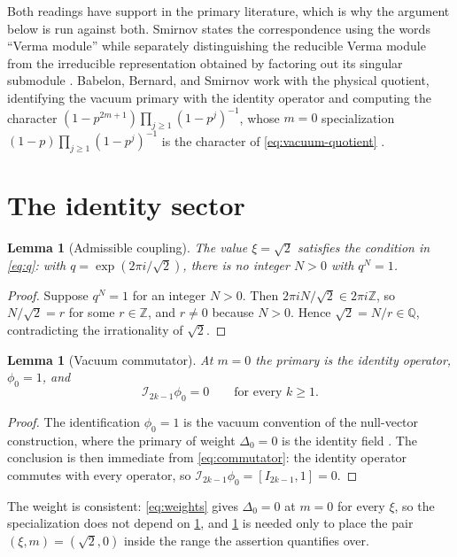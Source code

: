 \documentclass[11pt,reqno]{amsart}
\theoremstyle{plain}
\newtheorem{lemma}[theorem]{Lemma}
\theoremstyle{definition}
\theoremstyle{remark}
\numberwithin{equation}{section}
\newcommand{\Iop}{\mathcal I}
\begin{document}
Both readings have support in the primary literature, which is why the
argument below is run against both. Smirnov states the correspondence using
the words ``Verma module'' while separately distinguishing the reducible
Verma module from the irreducible representation obtained by factoring out its
singular submodule \cite{Smirnov_1998so}. Babelon, Bernard, and Smirnov work
with the physical quotient, identifying the vacuum primary with the identity
operator and computing the character
$(1-p^{2m+1})\prod_{j\ge1}(1-p^{j})^{-1}$, whose $m=0$ specialization
$(1-p)\prod_{j\ge1}(1-p^{j})^{-1}$ is the character of
\eqref{eq:vacuum-quotient} \cite{Babelon_1997nv}.

\section{The identity sector}
\label{sec:vacuum}

\begin{lemma}[Admissible coupling]
\label{lem:allowed}
The value $\xi=\sqrt2$ satisfies the condition in \eqref{eq:q}: with
$q=\exp(2\pi i/\sqrt2)$, there is no integer $N>0$ with $q^N=1$.
\end{lemma}

\begin{proof}
Suppose $q^N=1$ for an integer $N>0$. Then $2\pi iN/\sqrt2\in2\pi i\mathbb Z$,
so $N/\sqrt2=r$ for some $r\in\mathbb Z$, and $r\ne0$ because $N>0$. Hence
$\sqrt2=N/r\in\mathbb Q$, contradicting the irrationality of $\sqrt2$.
\end{proof}

\begin{lemma}[Vacuum commutator]
\label{lem:vacuum}
At $m=0$ the primary is the identity operator, $\phi_0=1$, and
\begin{equation}
  \Iop_{2k-1}\phi_0=0
  \qquad\text{for every }k\ge1.
  \label{eq:vacuum-zero}
\end{equation}
\end{lemma}

\begin{proof}
The identification $\phi_0=1$ is the vacuum convention of the null-vector
construction, where the primary of weight $\Delta_0=0$ is the identity field
\cite{Babelon_1997nv}. The conclusion is then immediate from
\eqref{eq:commutator}: the identity operator commutes with every operator, so
$\Iop_{2k-1}\phi_0=[I_{2k-1},1]=0$.
\end{proof}

The weight is consistent: \eqref{eq:weights} gives $\Delta_0=0$ at $m=0$ for
every $\xi$, so the specialization does not depend on \cref{lem:allowed}, and
\cref{lem:allowed} is needed only to place the pair $(\xi,m)=(\sqrt2,0)$
inside the range the assertion quantifies over.
\end{document}
